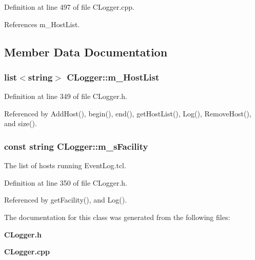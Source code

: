 Definition at line 497 of file CLogger.cpp.

References m\_\-Host\-List.

\subsection{Member Data Documentation}
\subsubsection{\setlength{\rightskip}{0pt plus 5cm}list$<$string$>$ CLogger::m\_\-Host\-List\hspace{0.3cm}{\tt  [private]}}\label{classCLogger_o0}




Definition at line 349 of file CLogger.h.

Referenced by Add\-Host(), begin(), end(), get\-Host\-List(), Log(), Remove\-Host(), and size().
\subsubsection{\setlength{\rightskip}{0pt plus 5cm}const string CLogger::m\_\-s\-Facility\hspace{0.3cm}{\tt  [private]}}\label{classCLogger_o1}


The list of hosts running Event\-Log.tcl.



Definition at line 350 of file CLogger.h.

Referenced by get\-Facility(), and Log().

The documentation for this class was generated from the following files:\begin{CompactItemize}
\item 
{\bf CLogger.h}\item 
{\bf CLogger.cpp}\end{CompactItemize}
